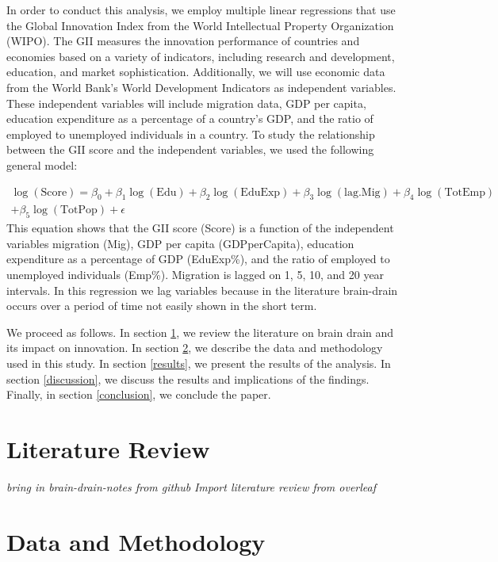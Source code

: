 \documentclass[12pt]{article}
\newcommand{\pointer}[1]{{\color{red} \center \textit{#1}}}
\begin{document}
In order to conduct this analysis, we employ multiple linear regressions that use the Global Innovation Index from the World Intellectual Property Organization (WIPO).
The GII measures the innovation performance of countries and economies based on a variety of indicators, including research and development, education, and market sophistication.
Additionally, we will use economic data from the World Bank's World Development Indicators as independent variables.
These independent variables will include migration data, GDP per capita, education expenditure as a percentage of a country's GDP, and the ratio of employed to unemployed individuals in a country.
To study the relationship between the GII score and the independent variables, we used the following general model:

\begin{align*}
    \log(\text{Score}) = \beta_0 + \beta_1\log(\text{Edu}) + \beta_2\log(\text{EduExp}) + \beta_3\log(\text{lag.Mig}) + \beta_4\log(\text{TotEmp}) \\ + \beta_5\log(\text{TotPop}) + \epsilon
\end{align*}
This equation shows that the GII score (Score) is a function of the independent variables migration (Mig), GDP per capita (GDPperCapita), education expenditure as a percentage of GDP (EduExp\%), and the ratio of employed to unemployed individuals (Emp\%).
Migration is lagged on 1, 5, 10, and 20 year intervals.
In this regression we lag variables because in the literature brain-drain occurs over a period of time not easily shown in the short term. 

We proceed as follows.
In section \ref{literature-review}, we review the literature on brain drain and its impact on innovation.
In section \ref{data-and-methodology}, we describe the data and methodology used in this study.
In section \ref{results}, we present the results of the analysis.
In section \ref{discussion}, we discuss the results and implications of the findings.
Finally, in section \ref{conclusion}, we conclude the paper.

\section{Literature Review} \label{literature-review}
\pointer{bring in brain-drain-notes from github}
\pointer{Import literature review from overleaf}
\section{Data and Methodology} \label{data-and-methodology}
\end{document}
